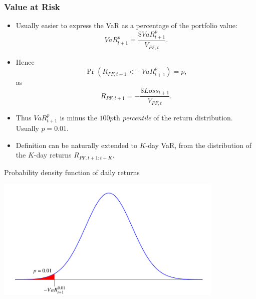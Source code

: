 \begin{frame}%

\frametitle{Value at Risk}

\begin{itemize}
\item Usually easier to express the VaR as a percentage of the portfolio value:
\begin{equation*}
VaR_{t+1}^{p}=\frac{\$VaR_{t+1}^{p}}{V_{PF,t}}.
\end{equation*}

\item Hence
\begin{equation*}
\Pr (R_{PF,t+1}<-VaR_{t+1}^{p})=p,
\end{equation*}%
as
\begin{equation*}
R_{PF,t+1}=-\frac{\$Loss_{t+1}}{V_{PF,t}}.
\end{equation*}

\item Thus $VaR_{t+1}^{p}$ is minus the $100p$th \emph{\color{red}percentile}
of the return distribution. Usually $p=0.01$.

\item Definition can be naturally extended to $K$-day VaR, from the
distribution of the $K$-day returns $R_{PF,t+1:t+K}$.
\end{itemize}

\end{frame}%

\begin{frame}%

\begin{block}{Probability density function of daily returns}
\centerline{\includegraphics[height=2.3in]{density}}
\end{block}

\end{frame}%

